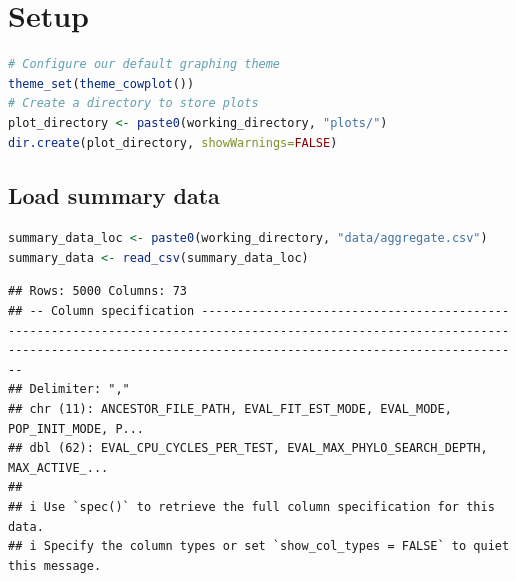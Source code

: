 \documentclass[
]{book}
\begin{document}
\hypertarget{setup-3}{%
\section{Setup}\label{setup-3}}

\begin{lstlisting}[language=R]
# Configure our default graphing theme
theme_set(theme_cowplot())
# Create a directory to store plots
plot_directory <- paste0(working_directory, "plots/")
dir.create(plot_directory, showWarnings=FALSE)
\end{lstlisting}

\hypertarget{load-summary-data}{%
\subsection{Load summary data}\label{load-summary-data}}

\begin{lstlisting}[language=R]
summary_data_loc <- paste0(working_directory, "data/aggregate.csv")
summary_data <- read_csv(summary_data_loc)
\end{lstlisting}

\begin{lstlisting}
## Rows: 5000 Columns: 73
## -- Column specification -----------------------------------------------------------------------------------------------------------------------------------------------------------------------------------------
## Delimiter: ","
## chr (11): ANCESTOR_FILE_PATH, EVAL_FIT_EST_MODE, EVAL_MODE, POP_INIT_MODE, P...
## dbl (62): EVAL_CPU_CYCLES_PER_TEST, EVAL_MAX_PHYLO_SEARCH_DEPTH, MAX_ACTIVE_...
## 
## i Use `spec()` to retrieve the full column specification for this data.
## i Specify the column types or set `show_col_types = FALSE` to quiet this message.
\end{lstlisting}
\end{document}

